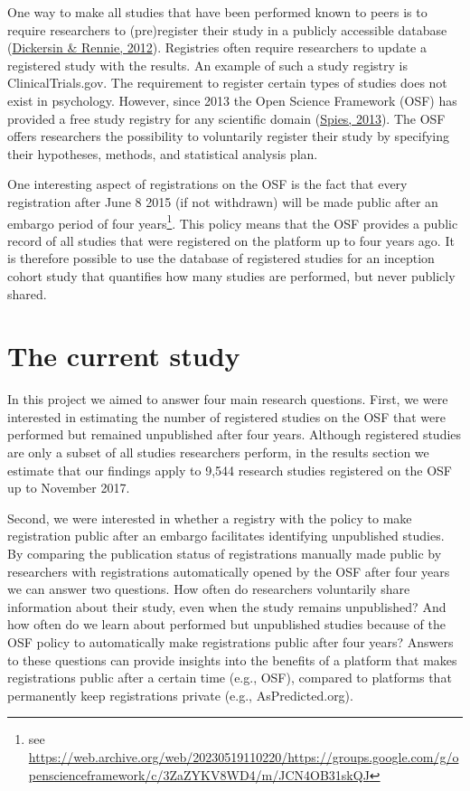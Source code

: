 \documentclass[
  ,jou, a4paper,floatsintext]{apa6}
\begin{document}
One way to make all studies that have been performed known to peers is to require researchers to (pre)register their study in a publicly accessible database (\protect\hyperlink{ref-dickersin_evolution_2012}{Dickersin \& Rennie, 2012}). Registries often require researchers to update a registered study with the results. An example of such a study registry is ClinicalTrials.gov. The requirement to register certain types of studies does not exist in psychology. However, since 2013 the Open Science Framework (OSF) has provided a free study registry for any scientific domain (\protect\hyperlink{ref-spies_open_2013}{Spies, 2013}). The OSF offers researchers the possibility to voluntarily register their study by specifying their hypotheses, methods, and statistical analysis plan.

One interesting aspect of registrations on the OSF is the fact that every registration after June 8 2015 (if not withdrawn) will be made public after an embargo period of four years\footnote{see \url{https://web.archive.org/web/20230519110220/https://groups.google.com/g/openscienceframework/c/3ZaZYKV8WD4/m/JCN4OB31skQJ}}. This policy means that the OSF provides a public record of all studies that were registered on the platform up to four years ago. It is therefore possible to use the database of registered studies for an inception cohort study that quantifies how many studies are performed, but never publicly shared.

\hypertarget{the-current-study}{%
\section{The current study}\label{the-current-study}}

In this project we aimed to answer four main research questions. First, we were interested in estimating the number of registered studies on the OSF that were performed but remained unpublished after four years. Although registered studies are only a subset of all studies researchers perform, in the results section we estimate that our findings apply to 9,544 research studies registered on the OSF up to November 2017.

Second, we were interested in whether a registry with the policy to make registration public after an embargo facilitates identifying unpublished studies. By comparing the publication status of registrations manually made public by researchers with registrations automatically opened by the OSF after four years we can answer two questions. How often do researchers voluntarily share information about their study, even when the study remains unpublished? And how often do we learn about performed but unpublished studies because of the OSF policy to automatically make registrations public after four years? Answers to these questions can provide insights into the benefits of a platform that makes registrations public after a certain time (e.g., OSF), compared to platforms that permanently keep registrations private (e.g., AsPredicted.org).
\end{document}
